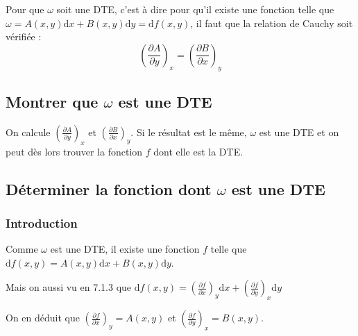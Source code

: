 \documentclass[french]{yLectureNote}
\begin{document}
Pour que $\omega$ soit une DTE, c'est à dire pour qu'il existe une fonction telle que $\omega = A(x,y)\mathrm{d}x+B(x,y)\mathrm{d}y = \mathrm{d}f(x,y)$, il faut que la relation de Cauchy soit vérifiée : \[(\frac{\partial A}{\partial y})_x = (\frac{\partial B}{\partial x})_y\]

\subsection{Montrer que $\omega$ est une DTE}
On calcule $\displaystyle (\frac{\partial A}{\partial y})_x$ et $\displaystyle(\frac{\partial B}{\partial x})_y$. Si le résultat est le m\^eme, $\omega$ est une DTE et on peut dès lors trouver la fonction $f$ dont elle est la DTE.
\subsection{Déterminer la fonction dont $\omega$ est une DTE}
\subsubsection{Introduction}
Comme $\omega$ est une DTE, il existe une fonction $f$ telle que $\mathrm{d}f(x,y) = A(x,y)\mathrm{d}x+B(x,y)\mathrm{d}y$.

Mais on aussi vu en 7.1.3 que $\mathrm{d}f(x,y) = (\frac{\partial f}{\partial x})_y\mathrm{d}x+(\frac{\partial f}{\partial y})_x\mathrm{d}y$

On en déduit que $(\frac{\partial f}{\partial x})_y = A(x,y)$ et $(\frac{\partial f}{\partial y})_x = B(x,y)$.
\end{document}
